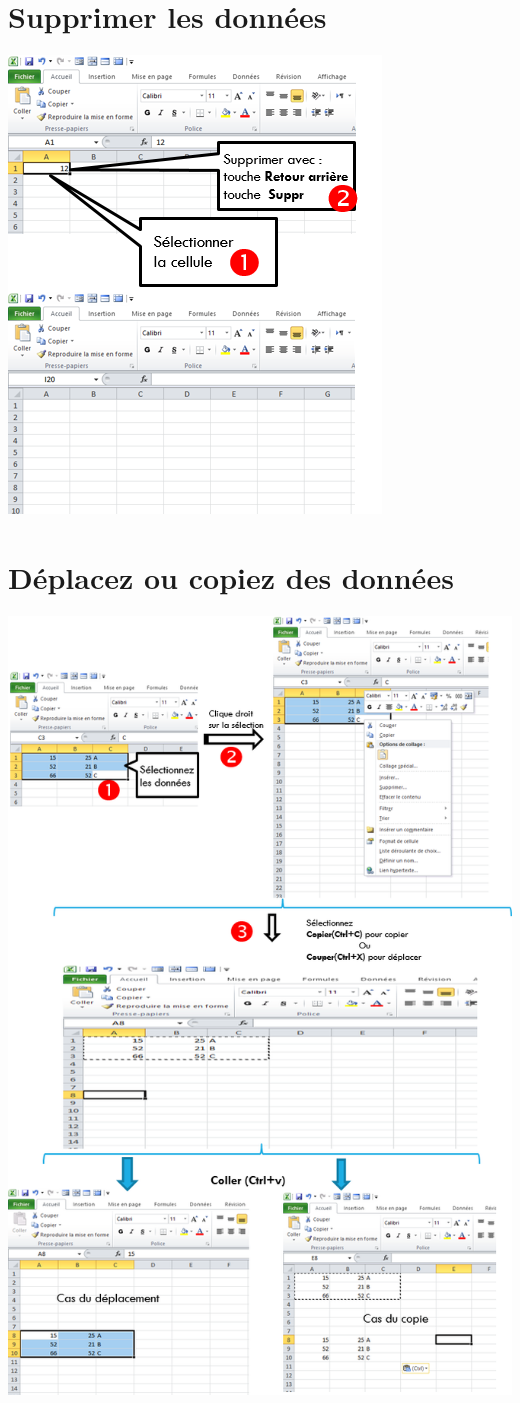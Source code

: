 \section{Supprimer les données} 
\begin{center} 
	\includegraphics[scale=0.2,width=0.5\linewidth]{img/delete_donner} 
\end{center}
\section{Déplacez ou copiez des données} 
	\begin{center} 
		\includegraphics[scale=0.2,width=0.9 \linewidth]{img/deplacer_donner} 
	\end{center}
